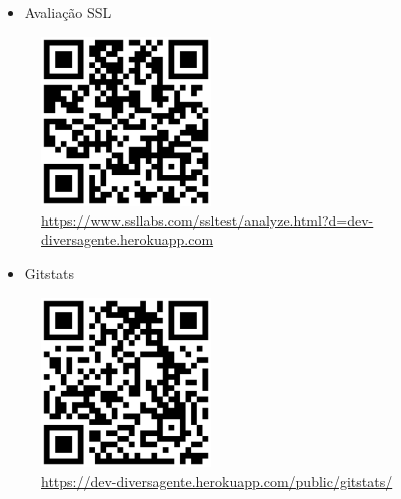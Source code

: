 \begin{itemize}
	\item Avaliação SSL
\end{itemize}
\begin{figure}[htb]
	\includegraphics[width=0.40\textwidth]{anexos/avaliacao_SSL.png} \\
	\hyperlink {Avaliação SSL}{https://www.ssllabs.com/ssltest/analyze.html?d=dev-diversagente.herokuapp.com}
\end{figure}

\pagebreak

\begin{itemize}
	\item Gitstats
\end{itemize}
\begin{figure}[htb]
	\includegraphics[width=0.40\textwidth]{anexos/gitstats.png} \\
	\hyperlink {Link do Gitstats}{https://dev-diversagente.herokuapp.com/public/gitstats/}
\end{figure}

\pagebreak

\newline